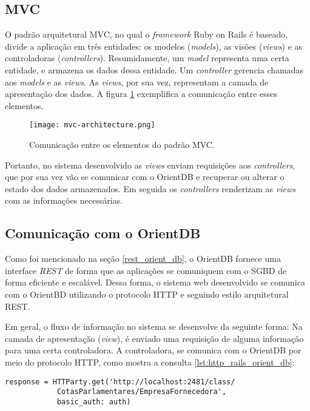 \subsection{MVC} \label{mvc-subsection}

	O padrão arquitetural MVC, no qual o \textit{framework} Ruby on Rails é baseado, divide a aplicação em três entidades: os modelos (\textit{models}), as visões (\textit{views}) e as controladoras (\textit{controllers}). Resumidamente, um \textit{model} representa uma certa entidade, e armazena os dados dessa entidade. Um \textit{controller} gerencia chamadas aos \textit{models} e as \textit{views}. As \textit{views}, por sua vez, representam a camada de apresentação dos dados. A figura \ref{fig:mvc} exemplifica a comunicação entre esses elementos.
	
\begin{figure}[H]
\centering
\texttt{[image: mvc-architecture.png]}
\caption{Comunicação entre os elementos do padrão MVC.}
\label{fig:mvc}
\end{figure}

Portanto, no sistema desenvolvido as \textit{views} enviam requisições aos \textit{controllers}, que por sua vez vão se comunicar com o OrientDB e recuperar ou alterar o estado dos dados armazenados. Em seguida os \textit{controllers} renderizam as \textit{views} com as informações necessárias.

\subsection{Comunicação com o OrientDB} \label{orient-communication}

	Como foi mencionado na seção \ref{rest_orient_db}, o OrientDB fornece uma interface \textit{REST} de forma que as aplicações se comuniquem com o SGBD de forma eficiente e escalável. Dessa forma, o sistema web desenvolvido se comunica com o OrientBD utilizando o protocolo HTTP e seguindo estilo arquitetural REST.
	
	Em geral, o fluxo de informação no sistema se desenvolve da seguinte forma: Na camada de apresentação (\textit{view}), é enviado uma requisição de alguma informação para uma certa controladora. A controladora, se comunica com o OrientDB por meio do protocolo HTTP, como mostra a consulta \ref{lst:http_rails_orient_db}:

\begin{lstlisting}[label={lst:http_rails_orient_db}, caption={Exemplo de consulta no OrientDB para retornar informações da classe de empresas fornecedoras.},captionpos=b]
response = HTTParty.get('http://localhost:2481/class/
			CotasParlamentares/EmpresaFornecedora', 
			basic_auth: auth)
\end{lstlisting}


